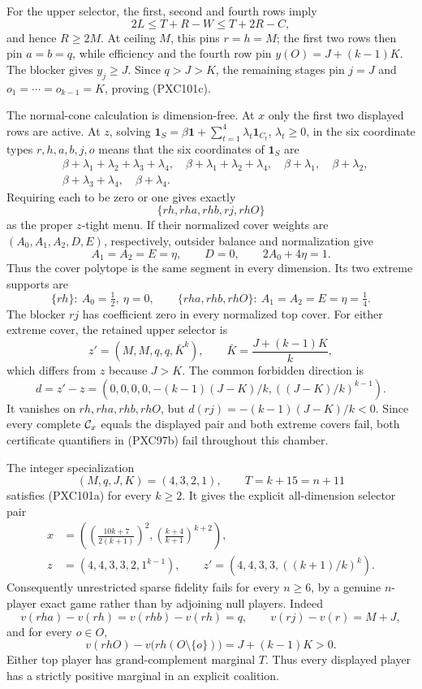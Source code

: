 \documentclass[11pt]{article}
\begin{document}
For the upper selector, the first, second and fourth rows imply
\[
 2L\le T+R-W\le T+2R-C,
\]
and hence \(R\ge2M\).  At ceiling \(M\), this pins \(r=h=M\);
the first two rows then pin \(a=b=q\), while efficiency and the fourth row
pin \(y(O)=J+(k-1)K\).  The blocker gives \(y_j\ge J\).
Since \(q>J>K\), the remaining stages pin \(j=J\) and
\(o_1=\cdots=o_{k-1}=K\), proving (PXC101c).

The normal-cone calculation is dimension-free.  At \(x\) only the first two
displayed rows are active.  At \(z\), solving
\(\mathbf1_S=\beta\mathbf1+\sum_{t=1}^4\lambda_t\mathbf1_{C_t}\),
\(\lambda_t\ge0\), in the six coordinate types \(r,h,a,b,j,o\) means that
the six coordinates of \(\mathbf1_S\) are
\[
 \begin{split}
 &\beta+\lambda_1+\lambda_2+\lambda_3+\lambda_4,\quad
 \beta+\lambda_1+\lambda_2+\lambda_4,\quad
 \beta+\lambda_1,\quad \beta+\lambda_2,\\
 &\beta+\lambda_3+\lambda_4,\quad \beta+\lambda_4.
 \end{split}
\]
Requiring each to be zero or one gives exactly
\[
 \{rh,rha,rhb,rj,rhO\}                         \tag{PXC101d}
\]
as the proper \(z\)-tight menu.  If their normalized cover weights are
\((A_0,A_1,A_2,D,E)\), respectively, outsider balance and normalization give
\[
 A_1=A_2=E=\eta,\qquad D=0,\qquad
 2A_0+4\eta=1.                                 \tag{PXC101e}
\]
Thus the cover polytope is the same segment in every dimension.  Its two
extreme supports are
\[
 \{rh\}:\ A_0=\tfrac12,\ \eta=0,\qquad
 \{rha,rhb,rhO\}:\ A_1=A_2=E=\eta=\tfrac14.
\]
The blocker \(rj\) has coefficient zero in every normalized top cover.
For either extreme cover, the retained upper selector is
\[
 z'=(M,M,q,q,\bar K^k),\qquad
 \bar K=\frac{J+(k-1)K}{k},                    \tag{PXC101f}
\]
which differs from \(z\) because \(J>K\).  The common forbidden direction is
\[
 d=z'-z=
 (0,0,0,0,-(k-1)(J-K)/k,((J-K)/k)^{k-1}).
\]
It vanishes on \(rh,rha,rhb,rhO\), but
\(d(rj)=-(k-1)(J-K)/k<0\).  Since every complete
\({\cal C}_x\) equals the displayed pair and both extreme covers fail,
both certificate quantifiers in (PXC97b) fail throughout this chamber.

The integer specialization
\[
 (M,q,J,K)=(4,3,2,1),\qquad T=k+15=n+11        \tag{PXC102a}
\]
satisfies (PXC101a) for every \(k\ge2\).  It gives the explicit
all-dimension selector pair
\begin{equation}
\begin{split}
 x&=\left(\left(\frac{10k+7}{2(k+1)}\right)^2,
              \left(\frac{k+4}{k+1}\right)^{k+2}\right),\\
 z&=(4,4,3,3,2,1^{k-1}),\qquad
 z'=(4,4,3,3,((k+1)/k)^k).
\end{split}
\tag{PXC102b}
\end{equation}
Consequently unrestricted sparse fidelity fails for every \(n\ge6\), by a
genuine \(n\)-player exact game rather than by adjoining null players.
Indeed
\[
 v(rha)-v(rh)=v(rhb)-v(rh)=q,\qquad v(rj)-v(r)=M+J,
\]
and for every \(o\in O\),
\[
 v(rhO)-v\bigl(rh(O\setminus\{o\})\bigr)=J+(k-1)K>0.
\]
Either top player has grand-complement marginal \(T\).  Thus every displayed
player has a strictly positive marginal in an explicit coalition.
\end{document}
